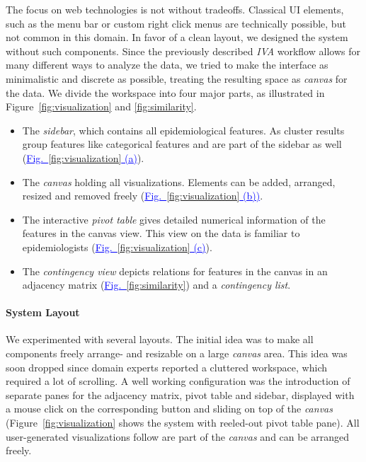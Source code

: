 \documentclass[journal]{style/vgtc} 			          %
\newcommand{\add}[1]{\textcolor{blue}{\uline{#1}}}
\begin{document}
The focus on web technologies is not without tradeoffs.
%
Classical UI elements, such as the menu bar or custom right click menus are technically possible, but not common in this domain.
%
In favor of a clean layout, we designed the system without such components.
%
Since the previously described \emph{IVA} workflow allows for many different ways to analyze the data, we tried to make the interface as minimalistic and discrete as possible, treating the resulting space as \emph{canvas} for the data.
%
We divide the workspace into four major parts, as illustrated in Figure~\ref{fig:visualization} and \ref{fig:similarity}.
\begin{itemize}
		\item The \emph{sidebar}, which contains all epidemiological features. As cluster results group features like categorical features and are part of the sidebar as well (\add{Fig.~\ref{fig:visualization} (a)}).
	\item The \emph{canvas} holding all visualizations. Elements can be added, arranged, resized and removed freely (\add{Fig.~\ref{fig:visualization} (b))}.
	\item The interactive \emph{pivot table} gives detailed numerical information of the features in the canvas view. This view on the data is familiar to epidemiologists (\add{Fig.~\ref{fig:visualization} (c)}).
	\item The \emph{contingency view} depicts relations for features in the canvas in an adjacency matrix (\add{Fig.~\ref{fig:similarity}}) and a \emph{contingency list}.
\end{itemize}

\paragraph{System Layout}
We experimented with several layouts.
%
The initial idea was to make all components freely arrange- and resizable on a large \emph{canvas} area.
%
This idea was soon dropped since domain experts reported a cluttered workspace, which required a lot of scrolling.
%
A well working configuration was the introduction of separate panes for the adjacency matrix, pivot table and sidebar, displayed with a mouse click on the corresponding button and sliding on top of the \emph{canvas} (Figure~\ref{fig:visualization} shows the system with reeled-out pivot table pane).
%
All user-generated visualizations follow are part of the \emph{canvas} and can be arranged freely.
\end{document}
